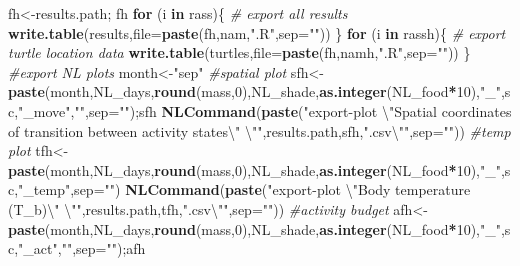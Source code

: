 \documentclass[]{article}
\newenvironment{Shaded}{\begin{snugshade}}{\end{snugshade}}
\newcommand{\KeywordTok}[1]{\textcolor[rgb]{0.13,0.29,0.53}{\textbf{#1}}}
\newcommand{\DataTypeTok}[1]{\textcolor[rgb]{0.13,0.29,0.53}{#1}}
\newcommand{\DecValTok}[1]{\textcolor[rgb]{0.00,0.00,0.81}{#1}}
\newcommand{\CharTok}[1]{\textcolor[rgb]{0.31,0.60,0.02}{#1}}
\newcommand{\StringTok}[1]{\textcolor[rgb]{0.31,0.60,0.02}{#1}}
\newcommand{\CommentTok}[1]{\textcolor[rgb]{0.56,0.35,0.01}{\textit{#1}}}
\newcommand{\ControlFlowTok}[1]{\textcolor[rgb]{0.13,0.29,0.53}{\textbf{#1}}}
\newcommand{\OperatorTok}[1]{\textcolor[rgb]{0.81,0.36,0.00}{\textbf{#1}}}
\newcommand{\NormalTok}[1]{#1}
\begin{document}
\begin{Shaded}
\begin{Highlighting}[]
\NormalTok{    fh<-results.path; fh}
    \ControlFlowTok{for}\NormalTok{ (i }\ControlFlowTok{in}\NormalTok{ rass)\{}
        \CommentTok{# export all results}
        \KeywordTok{write.table}\NormalTok{(results,}\DataTypeTok{file=}\KeywordTok{paste}\NormalTok{(fh,nam,}\StringTok{".R"}\NormalTok{,}\DataTypeTok{sep=}\StringTok{""}\NormalTok{))}
\NormalTok{        \}}
    \ControlFlowTok{for}\NormalTok{ (i }\ControlFlowTok{in}\NormalTok{ rassh)\{}
        \CommentTok{# export turtle location data}
        \KeywordTok{write.table}\NormalTok{(turtles,}\DataTypeTok{file=}\KeywordTok{paste}\NormalTok{(fh,namh,}\StringTok{".R"}\NormalTok{,}\DataTypeTok{sep=}\StringTok{""}\NormalTok{))}
\NormalTok{        \}}
        \CommentTok{#export NL plots}
\NormalTok{        month<-}\StringTok{"sep"}
        \CommentTok{#spatial plot}
\NormalTok{        sfh<-}\KeywordTok{paste}\NormalTok{(month,NL_days,}\KeywordTok{round}\NormalTok{(mass,}\DecValTok{0}\NormalTok{),NL_shade,}\KeywordTok{as.integer}\NormalTok{(NL_food}\OperatorTok{*}\DecValTok{10}\NormalTok{),}\StringTok{"_"}\NormalTok{,sc,}\StringTok{"_move"}\NormalTok{,}\StringTok{""}\NormalTok{,}\DataTypeTok{sep=}\StringTok{""}\NormalTok{);sfh}
        \KeywordTok{NLCommand}\NormalTok{(}\KeywordTok{paste}\NormalTok{(}\StringTok{"export-plot }\CharTok{\textbackslash{}"}\StringTok{Spatial coordinates of transition between activity states}\CharTok{\textbackslash{}"}\StringTok{ }\CharTok{\textbackslash{}"}\StringTok{"}\NormalTok{,results.path,sfh,}\StringTok{".csv}\CharTok{\textbackslash{}"}\StringTok{"}\NormalTok{,}\DataTypeTok{sep=}\StringTok{""}\NormalTok{))}
        \CommentTok{#temp plot }
\NormalTok{        tfh<-}\KeywordTok{paste}\NormalTok{(month,NL_days,}\KeywordTok{round}\NormalTok{(mass,}\DecValTok{0}\NormalTok{),NL_shade,}\KeywordTok{as.integer}\NormalTok{(NL_food}\OperatorTok{*}\DecValTok{10}\NormalTok{),}\StringTok{"_"}\NormalTok{,sc,}\StringTok{"_temp"}\NormalTok{,}\DataTypeTok{sep=}\StringTok{""}\NormalTok{)}
        \KeywordTok{NLCommand}\NormalTok{(}\KeywordTok{paste}\NormalTok{(}\StringTok{"export-plot }\CharTok{\textbackslash{}"}\StringTok{Body temperature (T_b)}\CharTok{\textbackslash{}"}\StringTok{ }\CharTok{\textbackslash{}"}\StringTok{"}\NormalTok{,results.path,tfh,}\StringTok{".csv}\CharTok{\textbackslash{}"}\StringTok{"}\NormalTok{,}\DataTypeTok{sep=}\StringTok{""}\NormalTok{))}
        \CommentTok{#activity budget}
\NormalTok{        afh<-}\KeywordTok{paste}\NormalTok{(month,NL_days,}\KeywordTok{round}\NormalTok{(mass,}\DecValTok{0}\NormalTok{),NL_shade,}\KeywordTok{as.integer}\NormalTok{(NL_food}\OperatorTok{*}\DecValTok{10}\NormalTok{),}\StringTok{"_"}\NormalTok{,sc,}\StringTok{"_act"}\NormalTok{,}\StringTok{""}\NormalTok{,}\DataTypeTok{sep=}\StringTok{""}\NormalTok{);afh}

\end{Highlighting}
\end{Shaded}
\end{document}
